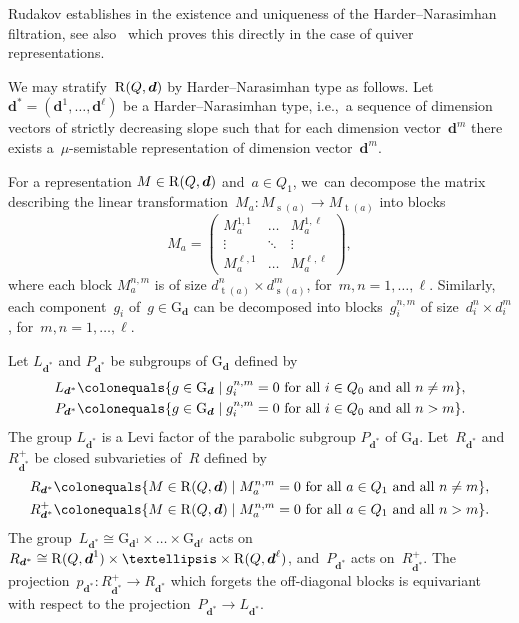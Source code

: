 \documentclass[11pt]{article}
\theoremstyle{plain}
\theoremstyle{definition}
\DeclareMathOperator\source{s}
\DeclareMathOperator\target{t}
\newcommand\group[1][\tuple{d}]{\mathrm{G}_{#1}}
\newcommand\tuple[1]{\ensuremath{{\boldsymbol{#1}}}}
\begin{document}
Rudakov establishes in \cite[Th.\,3]{MR1480783} the existence
and uniqueness
of the Harder--Nara\-sim\-han filtration,
see also~\cite[Th.\,2.5]{MR1906875} which proves this directly
in the case of quiver representations.

We may stratify~$\repspace{Q,\tuple{d}}$ by Harder--Narasimhan type as follows.
Let~$\tuple{d}^* = (\tuple{d}^1,\ldots,\tuple{d}^\ell)$ be a Harder--Narasimhan type,
i.e.,~a sequence of dimension vectors of strictly decreasing slope
such that for each dimension vector~$\tuple{d}^m$
there exists a~$\mu$\nobreakdash-semistable representation of dimension vector~$\tuple{d}^m$.

For a representation $M \in \repspace{Q,\tuple{d}}$
and~$a\in Q_1$, we~can decompose the matrix
describing the linear transformation~$M_a\colon M_{\source(a)}\to M_{\target(a)}$ into blocks
\begin{equation}
\label{equation:shape-matrix-HN-blocks}
M_a =
\left(
\begin{matrix}
M_a^{1,1} & \hdots & M_a^{1,\ell} \\
\vdots & \ddots & \vdots \\
M_a^{\ell,1} & \hdots & M_a^{\ell,\ell}
\end{matrix}
\right),
\end{equation}
where each block $M_a^{n,m}$ is of size $d^n_{\target(a)} \times d^m_{\source(a)}$,
for~$m,n=1,\ldots,\ell$.
Similarly, each component~$g_i$ of~$g \in \group$
can be decomposed into blocks~$g_i^{n,m}$ of size~$d^n_i \times d^m_i$,
for~$m,n=1,\ldots,\ell$.

Let $L_{\tuple{d}^*}$ and $P_{\tuple{d}^*}$ be subgroups of ${\group}$ defined by
\begin{align*}
L_{\tuple{d}^*} &\colonequals \{ g \in \group \mid g_i^{n,m} = 0 \text{ for all $i \in Q_0$ and all $n \neq m$}\}, \\
P_{\tuple{d}^*} &\colonequals \{ g \in \group \mid g_i^{n,m} = 0 \text{ for all $i \in Q_0$ and all $n > m$}\}.
\end{align*}
The group $L_{\tuple{d}^*}$ is a Levi factor of the parabolic subgroup $P_{\tuple{d}^*}$ of $\group$.
Let~$R_{\tuple{d}^*}$ and~$R_{\tuple{d}^*}^+$ be closed subvarieties of~$R$ defined by
\begin{equation}\label{equation:upper-triangular}
\begin{aligned}
R_{\tuple{d}^*} &\colonequals \{ M \in \repspace{Q,\tuple{d}} \mid M_a^{n,m} = 0 \text{ for all $a \in Q_1$ and all $n \neq m$}\}, \\
R_{\tuple{d}^*}^+ &\colonequals \{ M \in \repspace{Q,\tuple{d}} \mid M_a^{n,m} = 0 \text{ for all $a \in Q_1$ and all $n > m$}\}.
\end{aligned}
\end{equation}
The group~$L_{\tuple{d}^*} \cong \group[\tuple{d}^1] \times \ldots \times \group[\tuple{d}^\ell]$
acts on~$R_{\tuple{d}^*} \cong \repspace{Q,\tuple{d}^1} \times \ldots \times \repspace{Q,\tuple{d}^\ell}$,
and~$P_{\tuple{d}^*}$ acts on~$R_{\tuple{d}^*}^+$.
The projection~$p_{\tuple{d}^*}\colon R_{\tuple{d}^*}^+ \to R_{\tuple{d}^*}$
which forgets the off-diagonal blocks is equivariant with respect to the projection~$P_{\tuple{d}^*} \to L_{\tuple{d}^*}$.
\end{document}
